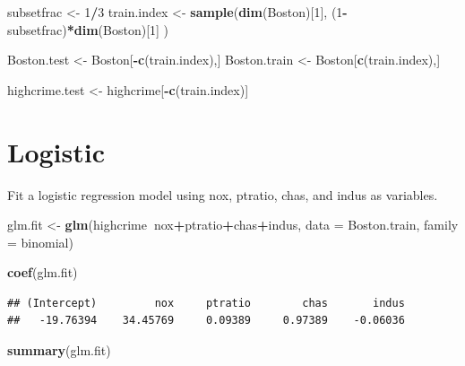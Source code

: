 \documentclass[
]{article}
\newenvironment{Shaded}{\begin{snugshade}}{\end{snugshade}}
\newcommand{\DataTypeTok}[1]{\textcolor[rgb]{0.13,0.29,0.53}{#1}}
\newcommand{\DecValTok}[1]{\textcolor[rgb]{0.00,0.00,0.81}{#1}}
\newcommand{\KeywordTok}[1]{\textcolor[rgb]{0.13,0.29,0.53}{\textbf{#1}}}
\newcommand{\NormalTok}[1]{#1}
\newcommand{\OperatorTok}[1]{\textcolor[rgb]{0.81,0.36,0.00}{\textbf{#1}}}
\newcommand{\StringTok}[1]{\textcolor[rgb]{0.31,0.60,0.02}{#1}}
\begin{document}
\begin{Shaded}
\begin{Highlighting}[]
\NormalTok{subsetfrac <-}\StringTok{ }\DecValTok{1}\OperatorTok{/}\DecValTok{3}
\NormalTok{train.index <-}\StringTok{ }\KeywordTok{sample}\NormalTok{(}\KeywordTok{dim}\NormalTok{(Boston)[}\DecValTok{1}\NormalTok{], (}\DecValTok{1}\OperatorTok{-}\NormalTok{subsetfrac)}\OperatorTok{*}\KeywordTok{dim}\NormalTok{(Boston)[}\DecValTok{1}\NormalTok{] )}

\NormalTok{Boston.test <-}\StringTok{ }\NormalTok{Boston[}\OperatorTok{-}\KeywordTok{c}\NormalTok{(train.index),]}
\NormalTok{Boston.train <-}\StringTok{ }\NormalTok{Boston[}\KeywordTok{c}\NormalTok{(train.index),]}

\NormalTok{highcrime.test <-}\StringTok{ }\NormalTok{highcrime[}\OperatorTok{-}\KeywordTok{c}\NormalTok{(train.index)]}
\end{Highlighting}
\end{Shaded}

\hypertarget{logistic}{%
\section{Logistic}\label{logistic}}

Fit a logistic regression model using nox, ptratio, chas, and indus as
variables.

\begin{Shaded}
\begin{Highlighting}[]
\NormalTok{glm.fit <-}\StringTok{ }\KeywordTok{glm}\NormalTok{(highcrime}\OperatorTok{~}\NormalTok{nox}\OperatorTok{+}\NormalTok{ptratio}\OperatorTok{+}\NormalTok{chas}\OperatorTok{+}\NormalTok{indus,}
               \DataTypeTok{data =}\NormalTok{ Boston.train,}
               \DataTypeTok{family =}\NormalTok{ binomial)}

\KeywordTok{coef}\NormalTok{(glm.fit)}
\end{Highlighting}
\end{Shaded}

\begin{verbatim}
## (Intercept)         nox     ptratio        chas       indus 
##   -19.76394    34.45769     0.09389     0.97389    -0.06036
\end{verbatim}

\begin{Shaded}
\begin{Highlighting}[]
\KeywordTok{summary}\NormalTok{(glm.fit)}
\end{Highlighting}
\end{Shaded}
\end{document}
